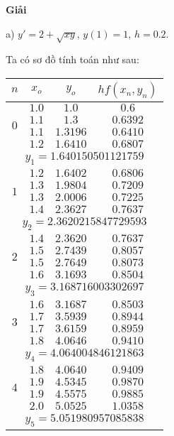 \textbf{Giải}\par

a) $y'=2+\sqrt{xy}$, $y(1)=1$, $h=0.2$.\par
Ta có sơ đồ tính toán như sau:

\begin{longtable}{|c|c|c|c|} \hline
$n$ & $x_o$ &$y_o$ &$hf(x_n,y_n)$ \\ \hline
\endhead

\multirow{4}{*}{$0$}
& $1.0$ & $1.0$ & $0.6$ \\ \cline{2-4}
& $1.1$ & $1.3$ & $0.6392$ \\ \cline{2-4}
& $1.1$ & $1.3196$ & $0.6410$ \\ \cline{2-4}
& $1.2$ & $1.6410$ & $0.6807$ \\ \hline
\multicolumn{4}{|c|}{$y_1 = 1.640150501121759$} \\ \hline

\multirow{4}{*}{$1$}
& $1.2$ & $1.6402$ & $0.6806$ \\ \cline{2-4}
& $1.3$ & $1.9804$ & $0.7209$ \\ \cline{2-4}
& $1.3$ & $2.0006$ & $0.7225$ \\ \cline{2-4}
& $1.4$ & $2.3627$ & $0.7637$ \\ \hline
\multicolumn{4}{|c|}{$y_2 = 2.3620215847729593$} \\ \hline

\multirow{4}{*}{$2$}
& $1.4$ & $2.3620$ & $0.7637$ \\ \cline{2-4}
& $1.5$ & $2.7439$ & $0.8057$ \\ \cline{2-4}
& $1.5$ & $2.7649$ & $0.8073$ \\ \cline{2-4}
& $1.6$ & $3.1693$ & $0.8504$ \\ \hline
\multicolumn{4}{|c|}{$y_3 = 3.168716003302697$} \\ \hline

\multirow{4}{*}{$3$}
& $1.6$ & $3.1687$ & $0.8503$ \\ \cline{2-4}
& $1.7$ & $3.5939$ & $0.8944$ \\ \cline{2-4}
& $1.7$ & $3.6159$ & $0.8959$ \\ \cline{2-4}
& $1.8$ & $4.0646$ & $0.9410$ \\ \hline
\multicolumn{4}{|c|}{$y_4 = 4.064004846121863$} \\ \hline

\multirow{4}{*}{$4$}
& $1.8$ & $4.0640$ & $0.9409$ \\ \cline{2-4}
& $1.9$ & $4.5345$ & $0.9870$ \\ \cline{2-4}
& $1.9$ & $4.5575$ & $0.9885$ \\ \cline{2-4}
& $2.0$ & $5.0525$ & $1.0358$ \\ \hline
\multicolumn{4}{|c|}{$y_5 = 5.051980957085838$} \\ \hline

\end{longtable}

